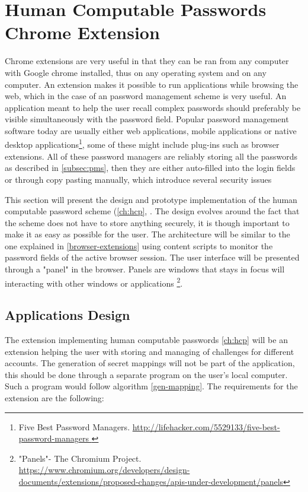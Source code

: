 \section{Human Computable Passwords Chrome Extension}
Chrome extensions are very useful in that they can be ran from any computer with Google chrome installed, thus on any operating system and on any computer. An extension makes it possible to run applications while browsing the web, which in the case of an password management scheme is very useful. An application meant to help the user recall complex passwords should preferably be visible simultaneously with the password field. Popular password management software today are usually either web applications, mobile applications or native desktop applications\footnote{Five Best Password Managers. \url{ http://lifehacker.com/5529133/five-best-password-managers }}, some of these might include plug-ins such as browser extensions. All of these password managers are reliably storing all the passwords as described in \autoref{subsec:pms}, then they are either auto-filled into the login fields or through copy pasting manually, which introduce several security issues\cite{protecting-browsers, javascript-injection, chrome-extension-dangers, carlini-chrome, liu-chrome, pw-managment-attacks}
\par This section will present the design and prototype implementation of the human computable password scheme (\autoref{ch:hcp}, \cite{hcp-blocki}. The design evolves around the fact that the scheme does not have to store anything securely, it is though important to make it as easy as possible for the user. The architecture will be similar to the one explained in \autoref{browser-extensions} using content scripts to monitor the password fields of the active browser session. The user interface will be presented through a "panel" in the browser. Panels are windows that stays in focus will interacting with other windows or applications \footnote{"Panels"- The Chromium Project. \url{https://www.chromium.org/developers/design-documents/extensions/proposed-changes/apis-under-development/panels}}.




\subsection{Applications Design}
The extension implementing human computable passwords \autoref{ch:hcp} will be an extension helping the user with storing and managing of challenges for different accounts. The generation of secret mappings will not be part of the application, this should be done through a separate program on the user's local computer. Such a program would follow algorithm \ref{gen-mapping}. The requirements for the extension are the following:

